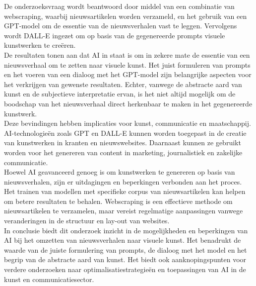De onderzoeksvraag wordt beantwoord door middel van een combinatie van webscraping, waarbij nieuwsartikelen worden verzameld, en het gebruik van een GPT-model om de essentie van de nieuwsverhalen vast te leggen. Vervolgens wordt DALL-E ingezet om op basis van de gegenereerde prompts visuele kunstwerken te creëren.\\

De resultaten tonen aan dat AI in staat is om in zekere mate de essentie van een nieuwsverhaal om te zetten naar visuele kunst. Het juist formuleren van prompts en het voeren van een dialoog met het GPT-model zijn belangrijke aspecten voor het verkrijgen van gewenste resultaten. Echter, vanwege de abstracte aard van kunst en de subjectieve interpretatie ervan, is het niet altijd mogelijk om de boodschap van het nieuwsverhaal direct herkenbaar te maken in het gegenereerde kunstwerk.\\

Deze bevindingen hebben implicaties voor kunst, communicatie en maatschappij. AI-technologieën zoals GPT en DALL-E kunnen worden toegepast in de creatie van kunstwerken in kranten en nieuwswebsites. Daarnaast kunnen ze gebruikt worden voor het genereren van content in marketing, journalistiek en zakelijke communicatie. \\

Hoewel AI geavanceerd genoeg is om kunstwerken te genereren op basis van nieuwsverhalen, zijn er uitdagingen en beperkingen verbonden aan het proces. Het trainen van modellen met specifieke corpus van nieuwsartikelen kan helpen om betere resultaten te behalen. Webscraping is een effectieve methode om nieuwsartikelen te verzamelen, maar vereist regelmatige aanpassingen vanwege veranderingen in de structuur en lay-out van websites.\\

In conclusie biedt dit onderzoek inzicht in de mogelijkheden en beperkingen van AI bij het omzetten van nieuwsverhalen naar visuele kunst. Het benadrukt de waarde van de juiste formulering van prompts, de dialoog met het model en het begrip van de abstracte aard van kunst. Het biedt ook aanknopingspunten voor verdere onderzoeken naar optimalisatiestrategieën en toepassingen van AI in de kunst en communicatiesector.

